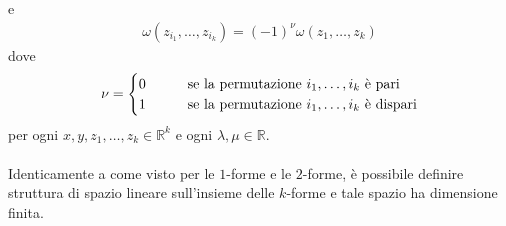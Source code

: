 \documentclass[twoside, 11pt]{amsbook}
\newcommand{\0}{{(0)}}
\newcommand{\3}{{(3)}}
\theoremstyle{colonplain}
\theoremstyle{colondefinition}
\theoremstyle{colonremark}
\numberwithin{equation}{chapter}
\begin{document}
e
\begin{align}
    \omega(z_{i_1}, \dots, z_{i_k}) = (-1)^\nu\omega(z_1, \dots, z_k)
\end{align}
dove 
\begin{align}
    \nu = 
    \begin{cases}
        0 \qquad &\text{se la permutazione } i_1, \dots, i_k \text{ è pari} \\
        1 \qquad &\text{se la permutazione } i_1, \dots, i_k \text{ è dispari}
    \end{cases} \notag
\end{align}
per ogni $x, y, z_1, \dots, z_k \in \mathbb{R}^k$ e ogni $\lambda, \mu \in \mathbb{R}$. \\ \\
Identicamente a come visto per le $1$-forme e le $2$-forme, è possibile definire struttura di spazio lineare sull'insieme delle $k$-forme e tale spazio ha dimensione finita.
\end{document}
